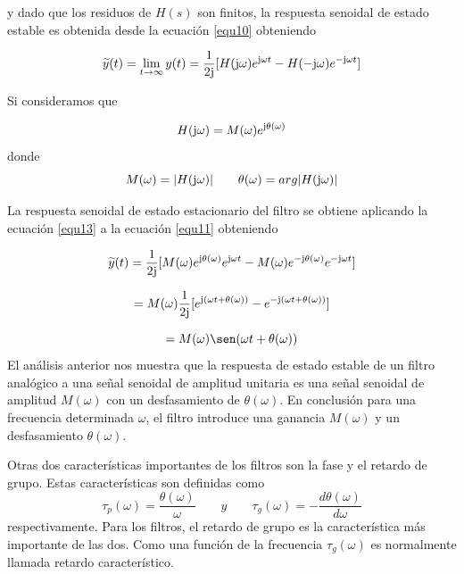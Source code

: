 \documentclass[12pt]{book}
\theoremstyle{definition}
\theoremstyle{remark}
\theoremstyle{plain}
\begin{document}
y dado que los residuos de $H(s)$ son finitos, la respuesta senoidal de estado estable es obtenida desde la ecuación \ref{equ10} obteniendo

\begin{equation}
\label{equ37}
\widetilde{y}(t) = \lim\limits_{t \to\infty} y(t) =  \frac{1}{2 \im}[H(\im \omega) e^{\im \omega t}-H(- \im \omega) e^{- \im \omega t}]
\end{equation}

Si consideramos que

\begin{equation}
\label{equ38}
H(\im \omega) = M(\omega)e^{\im \theta (\omega)}
\end{equation}
donde 
\begin{equation}
\label{equ39}
M(\omega) =| H(\im \omega)|  \qquad \theta(\omega) = arg |H(\im \omega)|
\end{equation}

La respuesta senoidal de estado estacionario del filtro se obtiene aplicando la ecuación \ref{equ13} a la ecuación \ref{equ11} obteniendo

\begin{equation*}
\widetilde{y}(t) =  \frac{1}{2 \im}[M(\omega) e^{\im \theta (\omega)} e^{\im \omega t}-M(\omega)e^{- \im \theta (\omega)} e^{- \im \omega t}]
\end{equation*}

\begin{equation*}
 = M(\omega) \frac{1}{2 \im}[e^{\im (  \omega t +  \theta (\omega))} - e^{- \im (  \omega t +  \theta (\omega))}]
\end{equation*}

\begin{equation*}
 = M(\omega) \sen (  \omega t +  \theta (\omega))
\end{equation*}
El análisis anterior nos muestra que la respuesta de estado estable de un filtro analógico a una señal senoidal de amplitud unitaria es una señal senoidal de amplitud $M(\omega)$ con un desfasamiento de $\theta (\omega)$. En conclusión para una frecuencia determinada $\omega$, el filtro introduce una ganancia $M(\omega)$ y un desfasamiento $\theta (\omega)$.

Otras dos características importantes de los filtros son la fase y el retardo de grupo. Estas características son definidas como
\begin{equation*}
\tau _p (\omega) = \frac{\theta(\omega)}{\omega}  \qquad y \qquad \tau_g (\omega) = - \frac{d \theta (\omega)}{d \omega}
\end{equation*}
respectivamente. Para los filtros, el retardo de grupo es la característica más importante de las dos. Como una función de la frecuencia $\tau_g (\omega)$ es normalmente llamada retardo característico.
\end{document}
